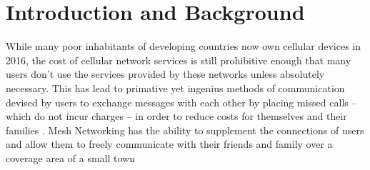 \section{Introduction and Background}
While many poor inhabitants of developing countries now own cellular devices in 2016, the cost
of cellular network services is still prohibitive enough that many users don't use the services
provided by these networks unless absolutely necessary.
This has lead to primative yet ingenius methods of communication devised by users to exchange 
messages with each other by placing missed calls -- which do not incur charges -- in order to 
reduce costs for themselves and their families \cite{beeping}.
Mesh Networking has the ability to supplement the connections of users and allow them to freely 
communicate with their friends and family over a coverage area of a small town
